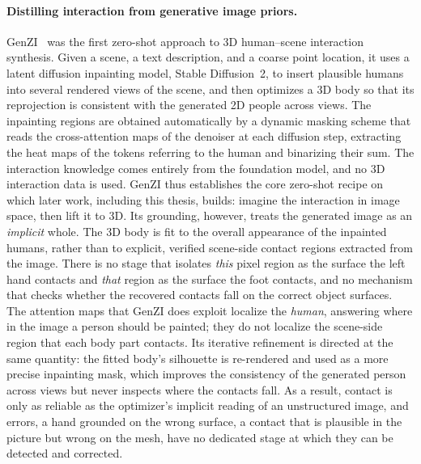 \paragraph{Distilling interaction from generative image priors.} GenZI~\cite{li2024genzi} was the first zero-shot approach to 3D human--scene interaction synthesis. Given a scene, a text description, and a coarse point location, it uses a latent diffusion inpainting model, Stable Diffusion~2, to insert plausible humans into several rendered views of the scene, and then optimizes a 3D body so that its reprojection is consistent with the generated 2D people across views. The inpainting regions are obtained automatically by a dynamic masking scheme that reads the cross-attention maps of the denoiser at each diffusion step, extracting the heat maps of the tokens referring to the human and binarizing their sum. The interaction knowledge comes entirely from the foundation model, and no 3D interaction data is used. GenZI thus establishes the core zero-shot recipe on which later work, including this thesis, builds: imagine the interaction in image space, then lift it to 3D. Its grounding, however, treats the generated image as an \emph{implicit} whole. The 3D body is fit to the overall appearance of the inpainted humans, rather than to explicit, verified scene-side contact regions extracted from the image. There is no stage that isolates \emph{this} pixel region as the surface the left hand contacts and \emph{that} region as the surface the foot contacts, and no mechanism that checks whether the recovered contacts fall on the correct object surfaces. The attention maps that GenZI does exploit localize the \emph{human}, answering where in the image a person should be painted; they do not localize the scene-side region that each body part contacts. Its iterative refinement is directed at the same quantity: the fitted body's silhouette is re-rendered and used as a more precise inpainting mask, which improves the consistency of the generated person across views but never inspects where the contacts fall. As a result, contact is only as reliable as the optimizer's implicit reading of an unstructured image, and errors, a hand grounded on the wrong surface, a contact that is plausible in the picture but wrong on the mesh, have no dedicated stage at which they can be detected and corrected.

